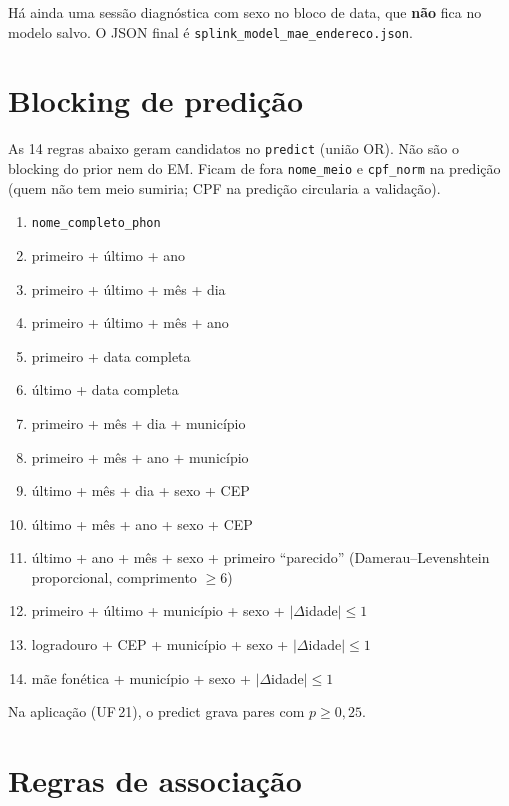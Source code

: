 \documentclass[11pt,a4paper]{article}
\begin{document}
Há ainda uma sessão diagnóstica com sexo no bloco de data, que \textbf{não}
fica no modelo salvo. O JSON final é
\texttt{splink\_model\_mae\_endereco.json}.

\section{Blocking de predição}

As 14 regras abaixo geram candidatos no \texttt{predict} (união OR). Não são
o blocking do prior nem do EM. Ficam de fora \texttt{nome\_meio} e
\texttt{cpf\_norm} na predição (quem não tem meio sumiria; CPF na predição
circularia a validação).

\begin{enumerate}[leftmargin=*,itemsep=0.15em]
  \item \texttt{nome\_completo\_phon}
  \item primeiro + último + ano
  \item primeiro + último + mês + dia
  \item primeiro + último + mês + ano
  \item primeiro + data completa
  \item último + data completa
  \item primeiro + mês + dia + município
  \item primeiro + mês + ano + município
  \item último + mês + dia + sexo + CEP
  \item último + mês + ano + sexo + CEP
  \item último + ano + mês + sexo + primeiro ``parecido''
        (Damerau--Levenshtein proporcional, comprimento $\ge 6$)
  \item primeiro + último + município + sexo + $|\Delta$idade$| \le 1$
  \item logradouro + CEP + município + sexo + $|\Delta$idade$| \le 1$
  \item mãe fonética + município + sexo + $|\Delta$idade$| \le 1$
\end{enumerate}

Na aplicação (UF\,21), o predict grava pares com $p \ge 0{,}25$.

\section{Regras de associação}
\end{document}
